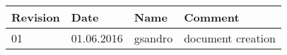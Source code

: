 \begin{center}
	\begin{tabular}{p{} p{}  p{}  p{}}
		\toprule
		Revision	& Date				& Name						& Comment 						\\
		\midrule
		01			& 01.06.2016		& gsandro		& document creation				\\
		\bottomrule
	\end{tabular}
\end{center}